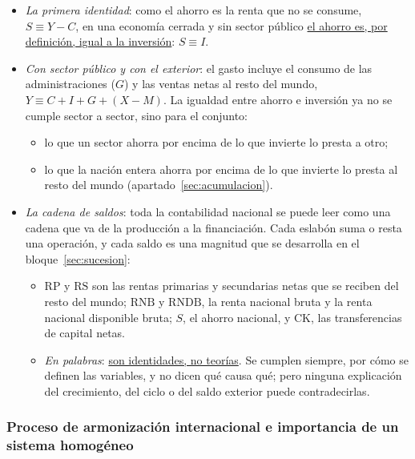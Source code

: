 \documentclass[11pt]{article}
\begin{document}
\begin{itemize}
\item \emph{La primera identidad}: como el ahorro es la renta que no se consume, $S\equiv Y-C$, en una economía cerrada y sin sector público \uline{el ahorro es, por definición, igual a la inversión}: $S\equiv I$.
\item \emph{Con sector público y con el exterior}: el gasto incluye el consumo de las administraciones ($G$) y las ventas netas al resto del mundo, $Y\equiv C+I+G+(X-M)$. La igualdad entre ahorro e inversión ya no se cumple sector a sector, sino para el conjunto:
  \begin{itemize}
  \item lo que un sector ahorra por encima de lo que invierte lo presta a otro;
  \item lo que la nación entera ahorra por encima de lo que invierte lo presta al resto del mundo (apartado~\ref{sec:acumulacion}).
  \end{itemize}
\item \emph{La cadena de saldos}: toda la contabilidad nacional se puede leer como una cadena que va de la producción a la financiación. Cada eslabón suma o resta una operación, y cada saldo es una magnitud que se desarrolla en el bloque~\ref{sec:sucesion}:
  \begin{itemize}
  \item $\mathrm{RP}$ y $\mathrm{RS}$ son las rentas primarias y secundarias netas que se reciben del resto del mundo; $\mathrm{RNB}$ y $\mathrm{RNDB}$, la renta nacional bruta y la renta nacional disponible bruta; $S$, el ahorro nacional, y $\mathrm{CK}$, las transferencias de capital netas.
  \item \emph{En palabras}: \uline{son identidades, no teorías}. Se cumplen siempre, por cómo se definen las variables, y no dicen qué causa qué; pero ninguna explicación del crecimiento, del ciclo o del saldo exterior puede contradecirlas.
  \end{itemize}
\end{itemize}

\subsubsection{Proceso de armonización internacional e importancia de un sistema homogéneo}\label{sec:armonizacion}
\end{document}
